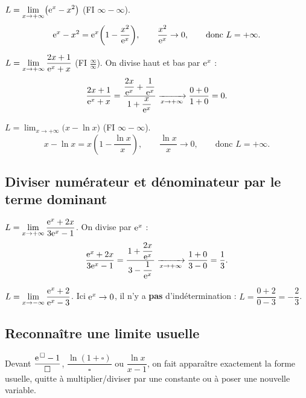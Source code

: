 \begin{exemple}
	$\displaystyle L=\lim_{x\to+\infty}\bigl(\mathrm{e}^x-x^2\bigr)$ (FI $\infty-\infty$).
	\[
	\mathrm{e}^x-x^2=\mathrm{e}^x\!\left(1-\frac{x^2}{\mathrm{e}^x}\right)\!,\qquad
	\frac{x^2}{\mathrm{e}^x}\to 0,\qquad\text{donc } L=+\infty .
	\]
\end{exemple}

\begin{exemple}
	$\displaystyle L=\lim_{x\to+\infty}\frac{2x+1}{\mathrm{e}^x+x}$ (FI $\frac{\infty}{\infty}$).
	On divise haut et bas par $\mathrm{e}^x$ :
	\[
	\frac{2x+1}{\mathrm{e}^x+x}
	=\frac{\dfrac{2x}{\mathrm{e}^x}+\dfrac{1}{\mathrm{e}^x}}{\,1+\dfrac{x}{\mathrm{e}^x}\,}
	\xrightarrow[x\to+\infty]{}\frac{0+0}{1+0}=0 .
	\]
\end{exemple}

\begin{exemple}
	$\displaystyle L=\lim_{x\to+\infty}\bigl(x-\ln x\bigr)$ (FI $\infty-\infty$).
	\[
	x-\ln x=x\!\left(1-\frac{\ln x}{x}\right)\!,\qquad
	\frac{\ln x}{x}\to 0,\qquad\text{donc } L=+\infty .
	\]
\end{exemple}

\subsection{Diviser numérateur et dénominateur par le terme dominant}

\begin{exemple}
	$\displaystyle L=\lim_{x\to+\infty}\frac{\mathrm{e}^x+2x}{3\mathrm{e}^x-1}$.
	On divise par $\mathrm{e}^x$ :
	\[
	\frac{\mathrm{e}^x+2x}{3\mathrm{e}^x-1}
	=\frac{1+\dfrac{2x}{\mathrm{e}^x}}{\,3-\dfrac{1}{\mathrm{e}^x}\,}
	\xrightarrow[x\to+\infty]{}\frac{1+0}{3-0}=\frac{1}{3}.
	\]
\end{exemple}

\begin{exemple}
	$\displaystyle L=\lim_{x\to-\infty}\frac{\mathrm{e}^x+2}{\mathrm{e}^x-3}$.
	Ici $\mathrm{e}^x\to 0$, il n'y a \textbf{pas} d'indétermination :
	$L=\dfrac{0+2}{0-3}=-\dfrac{2}{3}$.
\end{exemple}

\subsection{Reconnaître une limite usuelle}

\begin{methode}
	Devant $\dfrac{\mathrm{e}^{\,\square}-1}{\square}$, $\dfrac{\ln(1+\square)}{\square}$
	ou $\dfrac{\ln x}{x-1}$, on fait apparaître exactement la forme usuelle,
	quitte à multiplier/diviser par une constante ou à poser une nouvelle
	variable.
\end{methode}

